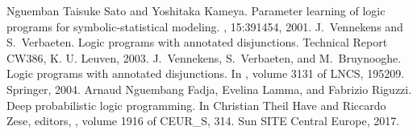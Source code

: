 \documentclass[letterpaper,10pt,english]{sphinxmanual}
\begin{document}
\begin{sphinxthebibliography}{Nguemban}
Taisuke Sato and Yoshitaka Kameya. Parameter learning of logic programs for symbolic-statistical modeling. , 15:391\textendash{}454, 2001.
J. Vennekens and S. Verbaeten. Logic programs with annotated disjunctions. Technical Report CW386, K. U. Leuven, 2003.
J. Vennekens, S. Verbaeten, and M. Bruynooghe. Logic programs with annotated disjunctions. In , volume 3131 of LNCS, 195\textendash{}209. Springer, 2004.
Arnaud Nguembang Fadja, Evelina Lamma, and Fabrizio Riguzzi. Deep probabilistic logic programming. In Christian Theil Have and Riccardo Zese, editors, , volume 1916 of CEUR\_S, 3\textendash{}14. Sun SITE Central Europe, 2017.
\end{sphinxthebibliography}



\renewcommand{\indexname}{Index}
\printindex
\end{document}
